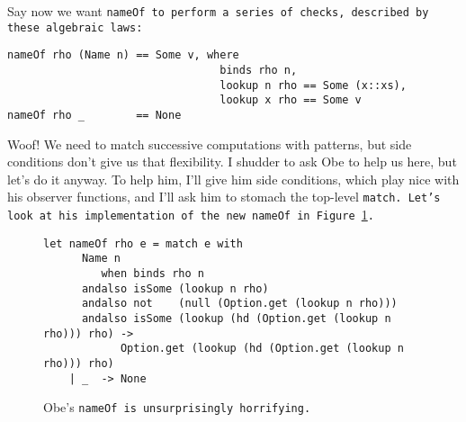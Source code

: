 \documentclass[manuscript,screen,review, 12pt]{acmart}
\begin{document}
    Say now we want \tt{nameOf} to perform a series of checks, described by
    these algebraic laws: 

    \begin{minipage}[t]{\textwidth}
        \centering 
        \begin{verbatim}
nameOf rho (Name n) == Some v, where 
                                 binds rho n, 
                                 lookup n rho == Some (x::xs),
                                 lookup x rho == Some v
nameOf rho _        == None 
        \end{verbatim}
    \end{minipage}




    
    

    Woof! We need to match successive computations with patterns, but side
    conditions don't give us that flexibility. I shudder to ask Obe to help us
    here, but let's do it anyway. To help him, I'll give him side conditions,
    which play nice with his observer functions, and I'll ask him to stomach the
    top-level \tt{match}. Let's look at his implementation of the new
    \tt{nameOf} in Figure~\ref{fig:obenameof}.

    \begin{figure}[ht]
        \begin{verbatim}
let nameOf rho e = match e with     
      Name n   
         when binds rho n 
      andalso isSome (lookup n rho) 
      andalso not    (null (Option.get (lookup n rho))) 
      andalso isSome (lookup (hd (Option.get (lookup n rho))) rho) ->
            Option.get (lookup (hd (Option.get (lookup n rho))) rho)
    | _  -> None
            \end{verbatim}
        \caption{Obe's \tt{nameOf} is unsurprisingly horrifying.}
        \label{fig:obenameof}
    \end{figure}
\end{document}
